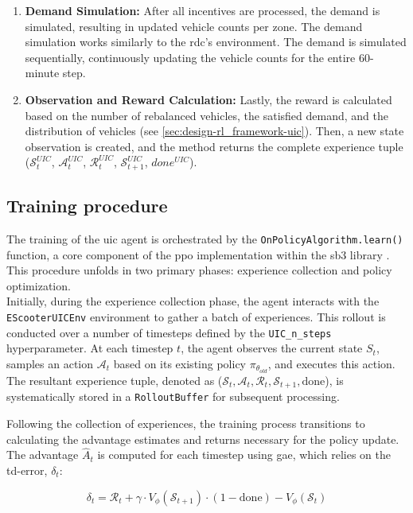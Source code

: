 \begin{enumerate}
    \item \textbf{Demand Simulation:}
        After all incentives are processed, the demand is simulated, resulting in updated vehicle counts per zone.
        The demand simulation works similarly to the \gls{rdc}'s environment.
        The demand is simulated sequentially, continuously updating the vehicle counts for the entire 60-minute step.
    \item \textbf{Observation and Reward Calculation:}
        Lastly, the reward is calculated based on the number of rebalanced vehicles, the satisfied demand, and the distribution of vehicles (see \autoref{sec:design-rl_framework-uic}).
        Then, a new state observation is created, and the method returns the complete experience tuple ($\mathcal{S}_t^{UIC}$, $\mathcal{A}_t^{UIC}$, $\mathcal{R}_t^{UIC}$, $\mathcal{S}_{t+1}^{UIC}$, $done^{UIC}$).
\end{enumerate}

\subsection{Training procedure}
The training of the \gls{uic} agent is orchestrated by the \texttt{OnPolicyAlgorithm.learn()} function, a core component of the \gls{ppo} implementation within the \gls{sb3} library \cite{raffin_stable-baselines3_2021}.
This procedure unfolds in two primary phases: experience collection and policy optimization.\\

Initially, during the experience collection phase, the agent interacts with the \texttt{EScooterUICEnv} environment to gather a batch of experiences.
This rollout is conducted over a number of timesteps defined by the \texttt{UIC\_n\_steps} hyperparameter.
At each timestep $t$, the agent observes the current state $S_t$, samples an action $\mathcal{A}_t$ based on its existing policy $\pi_{\theta_{old}}$, and executes this action.
The resultant experience tuple, denoted as ($\mathcal{S}_t, \mathcal{A}_t, \mathcal{R}_t, \mathcal{S}_{t+1}, \text{done}$), is systematically stored in a \texttt{RolloutBuffer} for subsequent processing.

Following the collection of experiences, the training process transitions to calculating the advantage estimates and returns necessary for the policy update.
The advantage $\hat{A}_t$ is computed for each timestep using \gls{gae}, which relies on the \gls{td-error}, $\delta_t$:

\begin{equation}
    \delta_t = \mathcal{R}_t + \gamma \cdot V_{\phi}(\mathcal{S}_{t+1}) \cdot (1 - \text{done}) - V_{\phi}(\mathcal{S}_t)
    \label{eq:uic_td_error_revised}
\end{equation}

